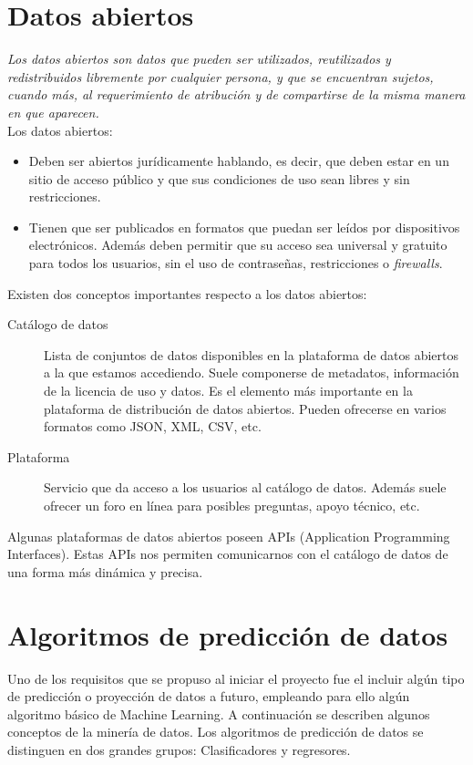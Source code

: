  \section{Datos abiertos}
\textit{Los datos abiertos son datos que pueden ser utilizados, reutilizados y redistribuidos libremente por cualquier persona, y que se encuentran sujetos, cuando más, al requerimiento de atribución y de compartirse de la misma manera en que aparecen.}\cite{datosabiertos}\\
Los datos abiertos:
\begin{itemize}
    \item Deben ser abiertos jurídicamente hablando, es decir, que deben estar en un sitio de acceso público y que sus condiciones de uso sean libres y sin restricciones.
    \item Tienen que ser publicados en formatos que puedan ser leídos por dispositivos electrónicos. Además deben permitir que su acceso sea universal y gratuito para todos los usuarios, sin el uso de contraseñas, restricciones o \textit{firewalls}.
\end{itemize}
Existen dos conceptos importantes respecto a los datos abiertos:
\begin{description}
    \item [Catálogo de datos] Lista de conjuntos de datos disponibles en la plataforma de datos abiertos a la que estamos accediendo. Suele componerse de metadatos, información de la licencia de uso y datos. Es el elemento más importante en la plataforma de distribución de datos abiertos. Pueden ofrecerse en varios formatos como JSON, XML, CSV, etc.
    \item[Plataforma] Servicio que da acceso a los usuarios al catálogo de datos. Además suele ofrecer un foro en línea para posibles preguntas, apoyo técnico, etc.
\end{description}
Algunas plataformas de datos abiertos poseen APIs (Application Programming Interfaces). Estas APIs nos permiten comunicarnos con el catálogo de datos de una forma más dinámica y precisa. 
\section{Algoritmos de predicción de datos}
Uno de los requisitos que se propuso al iniciar el proyecto fue el incluir algún tipo de predicción o proyección de datos a futuro, empleando para ello algún algoritmo básico de Machine Learning. A continuación se describen algunos conceptos de la minería de datos.
Los algoritmos de predicción de datos se distinguen en dos grandes grupos: Clasificadores y regresores.
